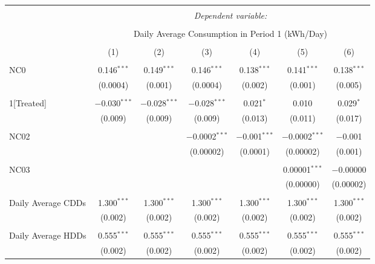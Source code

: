 
\begin{table}[!htbp] \centering 
  \caption{} 
  \label{} 
\small 
\begin{tabular}{@{\extracolsep{5pt}}lcccccc} 
\\[-1.8ex]\hline 
\hline \\[-1.8ex] 
 & \multicolumn{6}{c}{\textit{Dependent variable:}} \\ 
\cline{2-7} 
\\[-1.8ex] & \multicolumn{6}{c}{Daily Average Consumption in Period 1 (kWh/Day)} \\ 
\\[-1.8ex] & (1) & (2) & (3) & (4) & (5) & (6)\\ 
\hline \\[-1.8ex] 
 NC0 & 0.146$^{***}$ & 0.149$^{***}$ & 0.146$^{***}$ & 0.138$^{***}$ & 0.141$^{***}$ & 0.138$^{***}$ \\ 
  & (0.0004) & (0.001) & (0.0004) & (0.002) & (0.001) & (0.005) \\ 
  & & & & & & \\ 
 1[Treated] & $-$0.030$^{***}$ & $-$0.028$^{***}$ & $-$0.028$^{***}$ & 0.021$^{*}$ & 0.010 & 0.029$^{*}$ \\ 
  & (0.009) & (0.009) & (0.009) & (0.013) & (0.011) & (0.017) \\ 
  & & & & & & \\ 
 NC02 &  &  & $-$0.0002$^{***}$ & $-$0.001$^{***}$ & $-$0.0002$^{***}$ & $-$0.001 \\ 
  &  &  & (0.00002) & (0.0001) & (0.00002) & (0.001) \\ 
  & & & & & & \\ 
 NC03 &  &  &  &  & 0.00001$^{***}$ & $-$0.00000 \\ 
  &  &  &  &  & (0.00000) & (0.00002) \\ 
  & & & & & & \\ 
 Daily Average CDDs & 1.300$^{***}$ & 1.300$^{***}$ & 1.300$^{***}$ & 1.300$^{***}$ & 1.300$^{***}$ & 1.300$^{***}$ \\ 
  & (0.002) & (0.002) & (0.002) & (0.002) & (0.002) & (0.002) \\ 
  & & & & & & \\ 
 Daily Average HDDs & 0.555$^{***}$ & 0.555$^{***}$ & 0.555$^{***}$ & 0.555$^{***}$ & 0.555$^{***}$ & 0.555$^{***}$ \\ 
  & (0.002) & (0.002) & (0.002) & (0.002) & (0.002) & (0.002) \\ 

\end{tabular}
\end{table}
